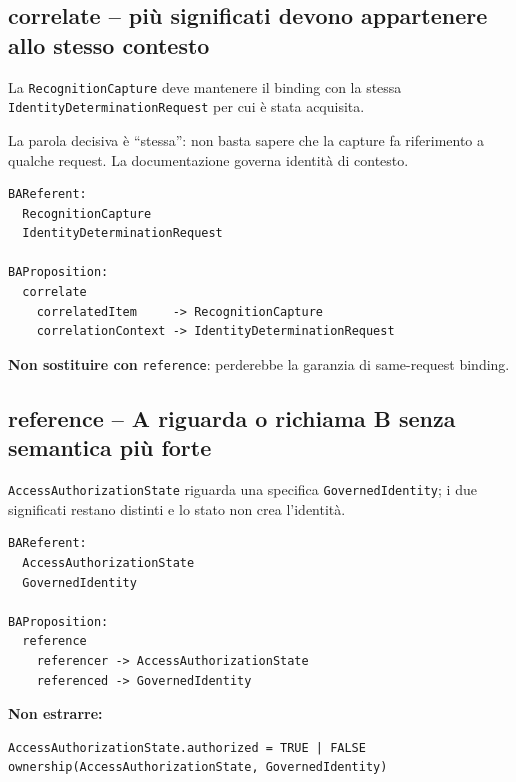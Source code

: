 \documentclass[11pt,a4paper]{article}
\newcommand{\code}[1]{\nolinkurl{#1}}
\begin{document}
\subsection{correlate -- più significati devono appartenere allo stesso contesto}

\begin{examplebox}
La \code{RecognitionCapture} deve mantenere il binding con la stessa \code{IdentityDeterminationRequest} per cui è stata acquisita.
\end{examplebox}

La parola decisiva è ``stessa'': non basta sapere che la capture fa riferimento a qualche request. La documentazione governa identità di contesto.

\begin{lstlisting}
BAReferent:
  RecognitionCapture
  IdentityDeterminationRequest

BAProposition:
  correlate
    correlatedItem     -> RecognitionCapture
    correlationContext -> IdentityDeterminationRequest
\end{lstlisting}

\textbf{Non sostituire con} \code{reference}: perderebbe la garanzia di same-request binding.

\subsection{reference -- A riguarda o richiama B senza semantica più forte}

\begin{examplebox}
\code{AccessAuthorizationState} riguarda una specifica \code{GovernedIdentity}; i due significati restano distinti e lo stato non crea l'identità.
\end{examplebox}

\begin{lstlisting}
BAReferent:
  AccessAuthorizationState
  GovernedIdentity

BAProposition:
  reference
    referencer -> AccessAuthorizationState
    referenced -> GovernedIdentity
\end{lstlisting}

\textbf{Non estrarre:}

\begin{lstlisting}
AccessAuthorizationState.authorized = TRUE | FALSE
ownership(AccessAuthorizationState, GovernedIdentity)
\end{lstlisting}
\end{document}
